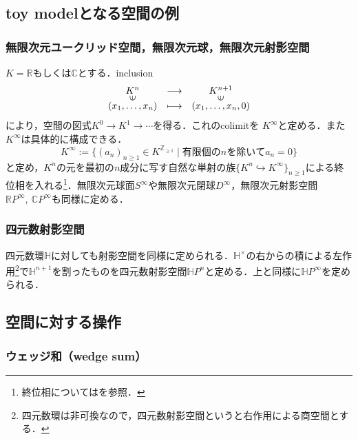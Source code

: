 \documentclass[a4paper,11pt]{jsarticle}
\theoremstyle{definition}
\begin{document}
\subsection{toy modelとなる空間の例}
\subsubsection{無限次元ユークリッド空間，無限次元球，無限次元射影空間}
$K=\mathbb{R}$もしくは$\mathbb{C}$とする．inclusion\[
\begin{array}{ccc}
K^n                   & \longrightarrow & K^{n+1}               \\[-4pt]
\rotatebox{90}{$\in$} &                 & \rotatebox{90}{$\in$} \\[-4pt]
(x_1,\dots,x_n)       & \longmapsto     & (x_1,\dots,x_n,0)
\end{array}
\]により，空間の図式$K^0\to K^1\to \cdots$を得る．これのcolimitを
$K^\infty$と定める．また$K^\infty$は具体的に構成できる．\[K^\infty:=\{(a_n)_{n\ge 1}\in K^{\mathbb{Z}_{\ge 1}}\mid 有限個のnを除いてa_n=0\}\]
と定め，$K^n$の元を最初の$n$成分に写す自然な単射の族$\{K^n\hookrightarrow K^\infty\}_{n\ge 1}$による終位相を入れる\footnote{終位相については\cite{nlab:weak_topology}を参照．}．無限次元球面$S^\infty$や無限次元閉球$D^\infty$，無限次元射影空間$\mathbb RP^\infty,\ \mathbb CP^\infty$も同様に定める．
\subsubsection{四元数射影空間}
四元数環$\mathbb H$に対しても射影空間を同様に定められる．$\mathbb H^\times$の右からの積による左作用\footnote{四元数環は非可換なので，四元数射影空間というと右作用による商空間とする．}で$\mathbb H^{n+1}$を割ったものを四元数射影空間$\mathbb HP^n$と定める．上と同様に$\mathbb HP^\infty$を定められる．
\subsection{空間に対する操作}
\subsubsection{ウェッジ和（wedge sum）}
\end{document}

